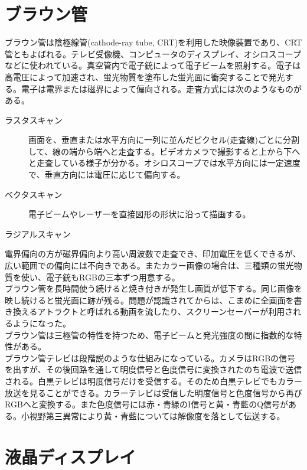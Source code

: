 \section{ブラウン管}
	ブラウン管は陰極線管(cathode-ray tube, CRT)を利用した映像装置であり、CRT管ともよばれる。テレビ受像機、コンピュータのディスプレイ、オシロスコープなどに使われている。真空管内で電子銃によって電子ビームを照射する。電子は高電圧によって加速され、蛍光物質を塗布した蛍光面に衝突することで発光する。電子は電界または磁界によって偏向される。走査方式には次のようなものがある。
	\begin{description}
		\item[ラスタスキャン] 画面を、垂直または水平方向に一列に並んだピクセル(走査線)ごとに分割して、線の端から端へと走査する。ビデオカメラで撮影すると上から下へと走査している様子が分かる。オシロスコープでは水平方向には一定速度で、垂直方向には電圧に応じて偏向する。
		\item[ベクタスキャン] 電子ビームやレーザーを直接図形の形状に沿って描画する。
		\item[ラジアルスキャン]
	\end{description}
	電界偏向の方が磁界偏向より高い周波数で走査でき、印加電圧を低くできるが、広い範囲での偏向には不向きである。またカラー画像の場合は、三種類の蛍光物質を使い、電子銃もRGBの三本ずつ用意する。\\
	ブラウン管を長時間使う続けると焼き付きが発生し画質が低下する。同じ画像を映し続けると蛍光面に跡が残る。問題が認識されてからは、こまめに全画面を書き換えるアトラクトと呼ばれる動画を流したり、スクリーンセーバーが利用されるようになった。\\
	ブラウン管は三極管の特性を持つため、電子ビームと発光強度の間に指数的な特性がある。\\
	ブラウン管テレビは段階説のような仕組みになっている。カメラはRGBの信号を出すが、その後回路を通して明度信号と色度信号に変換されたのち電波で送信される。白黒テレビは明度信号だけを受信する。そのため白黒テレビでもカラー放送を見ることができる。カラーテレビは受信した明度信号と色度信号から再びRGBへと変換する。また色度信号には赤・青緑のI信号と黄・青藍のQ信号がある。小視野第三異常により黄・青藍については解像度を落として伝送する。
\section{液晶ディスプレイ}